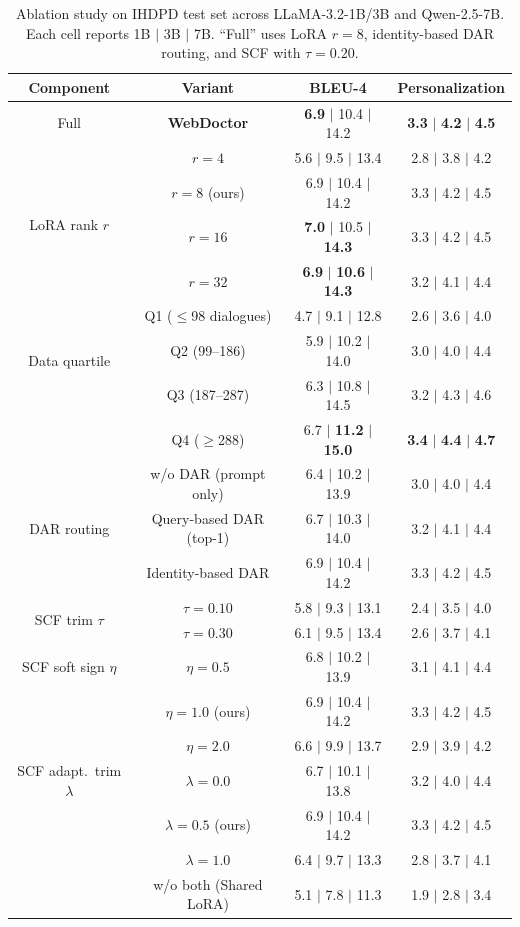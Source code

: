 \begin{table}[t]
\small
\renewcommand\arraystretch{1.07}
\centering
\caption{Ablation study on IHDPD test set across LLaMA-3.2-1B/3B and Qwen-2.5-7B. Each cell reports 1B $|$ 3B $|$ 7B. ``Full'' uses LoRA $r{=}8$, identity-based DAR routing, and SCF with $\tau{=}0.20$.}
\label{tab:ablation}
\begin{tabular}{c|c|cc}
\toprule
\textbf{Component} & \textbf{Variant} & \textbf{BLEU-4} & \textbf{Personalization} \\
\midrule
Full & \cellcolor{blue!5}\textbf{WebDoctor} & \cellcolor{blue!5}\textbf{6.9} $|$ 10.4 $|$ 14.2 & \cellcolor{blue!5}\textbf{3.3} $|$ \textbf{4.2} $|$ \textbf{4.5} \\
\midrule
\multirow{4}{*}{LoRA rank $r$} & $r=4$ & 5.6 $|$ 9.5 $|$ 13.4 & 2.8 $|$ 3.8 $|$ 4.2 \\
 & $r=8$ (ours) & 6.9 $|$ 10.4 $|$ 14.2 & 3.3 $|$ 4.2 $|$ 4.5 \\
 & $r=16$ & \textbf{7.0} $|$ 10.5 $|$ \textbf{14.3} & 3.3 $|$ 4.2 $|$ 4.5 \\
 & $r=32$ & \textbf{6.9} $|$ \textbf{10.6} $|$ \textbf{14.3} & 3.2 $|$ 4.1 $|$ 4.4 \\
\midrule
\multirow{3}{*}{Data quartile} & Q1 ($\le$98 dialogues) & 4.7 $|$ 9.1 $|$ 12.8 & 2.6 $|$ 3.6 $|$ 4.0 \\
 & Q2 (99--186) & 5.9 $|$ 10.2 $|$ 14.0 & 3.0 $|$ 4.0 $|$ 4.4 \\
 & Q3 (187--287) & 6.3 $|$ 10.8 $|$ 14.5 & 3.2 $|$ 4.3 $|$ 4.6 \\
 & Q4 ($\ge$288) & 6.7 $|$ \textbf{11.2} $|$ \textbf{15.0} & \textbf{3.4} $|$ \textbf{4.4} $|$ \textbf{4.7} \\
\midrule
\multirow{3}{*}{DAR routing} & w/o DAR (prompt only) & 6.4 $|$ 10.2 $|$ 13.9 & 3.0 $|$ 4.0 $|$ 4.4 \\
 & Query-based DAR (top-1) & 6.7 $|$ 10.3 $|$ 14.0 & 3.2 $|$ 4.1 $|$ 4.4 \\
 & Identity-based DAR & 6.9 $|$ 10.4 $|$ 14.2 & 3.3 $|$ 4.2 $|$ 4.5 \\
\midrule
\multirow{2}{*}{SCF trim $\tau$} & $\tau=0.10$ & 5.8 $|$ 9.3 $|$ 13.1 & 2.4 $|$ 3.5 $|$ 4.0 \\
 & $\tau=0.30$ & 6.1 $|$ 9.5 $|$ 13.4 & 2.6 $|$ 3.7 $|$ 4.1 \\
\midrule
SCF soft sign $\eta$ & $\eta=0.5$ & 6.8 $|$ 10.2 $|$ 13.9 & 3.1 $|$ 4.1 $|$ 4.4 \\
 & $\eta=1.0$ (ours) & 6.9 $|$ 10.4 $|$ 14.2 & 3.3 $|$ 4.2 $|$ 4.5 \\
 & $\eta=2.0$ & 6.6 $|$ 9.9 $|$ 13.7 & 2.9 $|$ 3.9 $|$ 4.2 \\
\midrule
SCF adapt.\ trim $\lambda$ & $\lambda=0.0$ & 6.7 $|$ 10.1 $|$ 13.8 & 3.2 $|$ 4.0 $|$ 4.4 \\
 & $\lambda=0.5$ (ours) & 6.9 $|$ 10.4 $|$ 14.2 & 3.3 $|$ 4.2 $|$ 4.5 \\
 & $\lambda=1.0$ & 6.4 $|$ 9.7 $|$ 13.3 & 2.8 $|$ 3.7 $|$ 4.1 \\
 & w/o both (Shared LoRA) & 5.1 $|$ 7.8 $|$ 11.3 & 1.9 $|$ 2.8 $|$ 3.4 \\
\bottomrule
\end{tabular}
\end{table}

